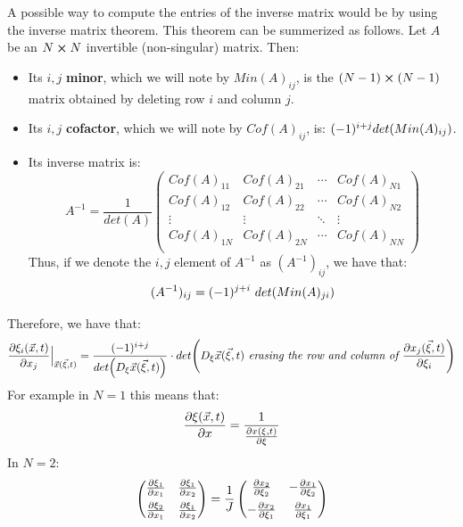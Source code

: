\documentclass[11pt, a4paper]{article} %
\begin{document}
A possible way to compute the entries of the inverse matrix would be by using the inverse matrix theorem. This theorem can be summerized as follows. Let $A$ be an $N\cross N$ invertible (non-singular) matrix. Then:
\begin{itemize}
\item Its $i,j$ {\bf minor}, which we will note by $Min(A)_{ij}$, is the $(N-1)\cross (N-1)$ matrix obtained by deleting row $i$ and column $j$.
\item Its $i,j$ {\bf cofactor}, which we will note by $Cof(A)_{ij}$, is: $(-1)^{i+j}det\qty(Min(A)_{ij})$.
\item Its inverse matrix is:
\begin{equation}
A^{-1}=\frac{1}{det(A)} \begin{pmatrix}
Cof(A)_{11} & Cof(A)_{21}&\cdots& Cof(A)_{N1}\\
Cof(A)_{12} & Cof(A)_{22}&\cdots& Cof(A)_{N2}\\
\vdots & \vdots & \ddots & \vdots \\
Cof(A)_{1N} & Cof(A)_{2N}&\cdots& Cof(A)_{NN}\\
\end{pmatrix}
\end{equation}
Thus, if we denote the $i,j$ element of $A^{-1}$ as $(A^{-1})_{ij}$, we have that:
\begin{equation}
(A^{-1})_{ij} = (-1)^{j+i}\ det\qty(Min(A)_{ji} )
\end{equation}
\end{itemize}
Therefore, we have that:
\begin{equation}\label{JacobChange}
\pdv{\xi_i(\vec{x},t)}{x_j}\Big\rvert_{\vec{x}(\vec{\xi},t)} = \frac{ (-1)^{i+j}}{det \qty(D_{\xi} \vec{x}(\vec{\xi},t))}\cdot det \qty(D_{\xi} \vec{x}(\vec{\xi},t)\textit{ erasing the row and column of }\pdv{x_j(\vec{\xi},t)}{\xi_i} )
\end{equation}
For example in $N=1$ this means that:
\begin{equation}
\pdv{\xi(\vec{x},t)}{x}=\frac{1}{\pdv{x(\xi,t)}{\xi}}
\end{equation}
In $N=2$:
\begin{equation}
\begin{pmatrix}
\pdv{\xi_1}{x_1} & \pdv{\xi_1}{x_2} \vspace{0.15cm}\\
\pdv{\xi_2}{x_1} & \pdv{\xi_1}{x_2}
\end{pmatrix}= \frac{1}{J} \begin{pmatrix}
\pdv{x_2}{\xi_2} & - \pdv{x_1}{\xi_2} \vspace{0.15cm}\\
-\pdv{x_2}{\xi_1} & \pdv{x_1}{\xi_1
} 
\end{pmatrix}
\end{equation}
\end{document}
